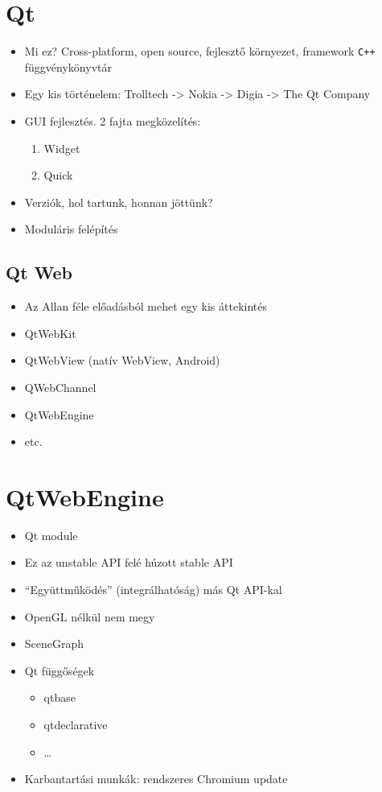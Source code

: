 \documentclass[12pt]{report}
\begin{document}
\section{Qt}
\begin{itemize}
    \item Mi ez?
        \subitem Cross-platform, open source, fejlesztő környezet, framework
        \subitem \texttt{C++} függvénykönyvtár
    \item Egy kis történelem:
        \subitem Trolltech -> Nokia -> Digia -> The Qt Company
    \item GUI fejlesztés. 2 fajta megközelítés:
        \begin{enumerate}
            \item Widget
            \item Quick
        \end{enumerate}
    \item Verziók, hol tartunk, honnan jöttünk?
    \item Moduláris felépítés
\end{itemize}

\subsection{Qt Web}
\begin{itemize}
    \item Az Allan féle előadásból mehet egy kis áttekintés
    \item QtWebKit
    \item QtWebView (natív WebView, Android)
    \item QWebChannel
    \item QtWebEngine
    \item etc.
\end{itemize}

\section{QtWebEngine}
\begin{itemize}
    \item Qt module
    \item Ez az unstable API felé húzott stable API
    \item ``Együttműködés'' (integrálhatóság) más Qt API-kal
    \item OpenGL nélkül nem megy
    \item SceneGraph
    \item Qt függőségek
        \begin{itemize}
            \item qtbase
            \item qtdeclarative
            \item \dots
        \end{itemize}
    \item Karbantartási munkák: rendszeres Chromium update
\end{itemize}
\end{document}
